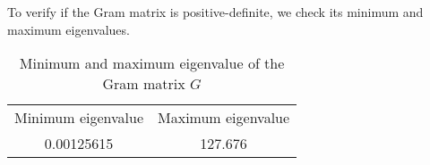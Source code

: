 To verify if the Gram matrix is positive-definite, we check its minimum and maximum eigenvalues.

\begin{table} 
    \begin{tabular}{ c c  }
        Minimum eigenvalue & Maximum eigenvalue \\
        0.00125615 & 127.676 \\ 
    \end{tabular} 
    \caption{Minimum and maximum eigenvalue of the Gram matrix $G$} 
\end{table}
